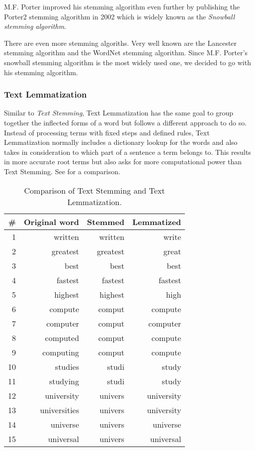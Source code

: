 M.F. Porter improved his stemming algorithm even further
by publishing the Porter2 stemming algorithm in 2002
which is widely known as the \textit{Snowball stemming algorithm}\cite{SnowballStemmerAlgorithm}.

There are even more stemming algoriths.
Very well known are the Lancester stemming algorithm\cite{LancesterStemmer}
and the WordNet stemming algorithm\cite{WordNetStemmer}.
Since M.F. Porter's snowball stemming algorithm is the most widely used one,
we decided to go with his stemming algorithm.

\subsubsection{Text Lemmatization}
\label{subsubsec:3_text_lemmatization}

Similar to \textit{Text Stemming}, Text Lemmatization has the same goal to group together the inflected forms of a word
but follows a different approach to do so.
Instead of processing terms with fixed steps and defined rules,
Text Lemmatization normally includes a dictionary lookup for the words
and also takes in consideration to which part of a sentence a term belongs to.
This results in more accurate root terms but also asks for more computational power than Text Stemming.
See  for a comparison.

\begin{table}[h]
    \centering
    \begin{tabular}{|r|r|r|r|}
    \hline
    \textbf{\#} & \textbf{Original word} & \textbf{Stemmed} & \textbf{Lemmatized} \\ \hline
    1 & written & written & write \\ \hline
    2 & greatest & greatest & great \\ \hline
    3 & best & best & best \\ \hline
    4 & fastest & fastest & fastest \\ \hline
    5 & highest & highest & high \\ \hline
    6 & compute & comput & compute \\ \hline
    7 & computer & comput & computer \\ \hline
    8 & computed & comput & compute \\ \hline
    9 & computing & comput & compute \\ \hline
    10 & studies & studi & study \\ \hline
    11 & studying & studi & study \\ \hline
    12 & university & univers & university \\ \hline
    13 & universities & univers & university \\ \hline
    14 & universe & univers & universe \\ \hline
    15 & universal & univers & universal \\ \hline
    \end{tabular}
    \caption{Comparison of Text Stemming and Text Lemmatization.}
    \label{tab:comparison_stemming_lemmatization}
\end{table}


